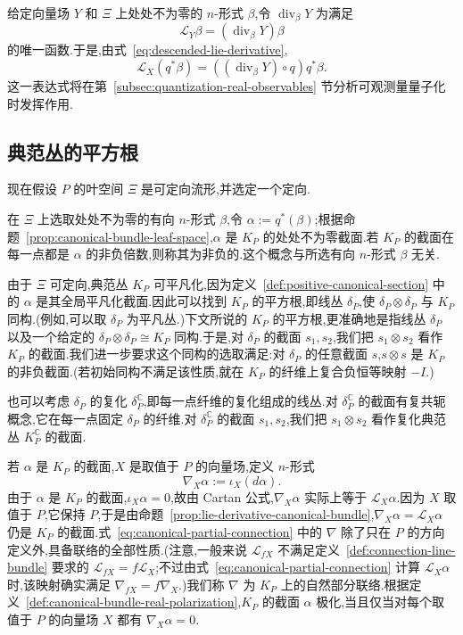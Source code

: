 {给定向量场 $Y$ 和 $\Xi$ 上处处不为零的 $n$-形式 $\beta$,令 $\operatorname{div}_\beta Y$ 为满足
\[
 \mathcal L_Y\beta=(\operatorname{div}_\beta Y)\beta
\]
的唯一函数.于是,由式~\eqref{eq:descended-lie-derivative},
\[
 \mathcal L_X(q^*\beta)
 =((\operatorname{div}_\beta Y)\circ q)q^*\beta.
 \label{eq:canonical-bundle-divergence}
\]
这一表达式将在第~\ref{subsec:quantization-real-observables} 节分析可观测量量子化时发挥作用.

\subsection{典范丛的平方根}
\label{subsec:square-root-canonical-bundle}

现在假设 $P$ 的叶空间 $\Xi$ 是可定向流形,并选定一个定向.

\begin{definition}[典范丛的正截面]
\label{def:positive-canonical-section}
在 $\Xi$ 上选取处处不为零的有向 $n$-形式 $\beta$,令 $\alpha:=q^*(\beta)$;根据命题~\ref{prop:canonical-bundle-leaf-space},$\alpha$ 是 $K_P$ 的处处不为零截面.若 $K_P$ 的截面在每一点都是 $\alpha$ 的非负倍数,则称其为非负的.这个概念与所选有向 $n$-形式 $\beta$ 无关.
\end{definition}

由于 $\Xi$ 可定向,典范丛 $K_P$ 可平凡化,因为定义~\ref{def:positive-canonical-section} 中的 $\alpha$ 是其全局平凡化截面.因此可以找到 $K_P$ 的平方根,即线丛 $\delta_P$,使 $\delta_P\otimes\delta_P$ 与 $K_P$ 同构.(例如,可以取 $\delta_P$ 为平凡丛.)下文所说的 $K_P$ 的平方根,更准确地是指线丛 $\delta_P$ 以及一个给定的 $\delta_P\otimes\delta_P\cong K_P$ 同构.于是,对 $\delta_P$ 的截面 $s_1,s_2$,我们把 $s_1\otimes s_2$ 看作 $K_P$ 的截面.我们进一步要求这个同构的选取满足:对 $\delta_P$ 的任意截面 $s$,$s\otimes s$ 是 $K_P$ 的非负截面.(若初始同构不满足该性质,就在 $K_P$ 的纤维上复合负恒等映射 $-I$.)

也可以考虑 $\delta_P$ 的复化 $\delta_P^{\mathbb C}$,即每一点纤维的复化组成的线丛.对 $\delta_P^{\mathbb C}$ 的截面有复共轭概念,它在每一点固定 $\delta_P$ 的纤维.对 $\delta_P^{\mathbb C}$ 的截面 $s_1,s_2$,我们把 $s_1\otimes s_2$ 看作复化典范丛 $K_P^{\mathbb C}$ 的截面.

若 $\alpha$ 是 $K_P$ 的截面,$X$ 是取值于 $P$ 的向量场,定义 $n$-形式
\[
 \nabla_X\alpha:=\iota_X(d\alpha).
 \label{eq:canonical-partial-connection}
\]
由于 $\alpha$ 是 $K_P$ 的截面,$\iota_X\alpha=0$,故由 Cartan 公式,$\nabla_X\alpha$ 实际上等于 $\mathcal L_X\alpha$.因为 $X$ 取值于 $P$,它保持 $P$,于是由命题~\ref{prop:lie-derivative-canonical-bundle},$\nabla_X\alpha=\mathcal L_X\alpha$ 仍是 $K_P$ 的截面.式~\eqref{eq:canonical-partial-connection} 中的 $\nabla$ 除了只在 $P$ 的方向定义外,具备联络的全部性质.(注意,一般来说 $\mathcal L_{fX}$ 不满足定义~\ref{def:connection-line-bundle} 要求的 $\mathcal L_{fX}=f\mathcal L_X$;不过由式~\eqref{eq:canonical-partial-connection} 计算 $\mathcal L_X\alpha$ 时,该映射确实满足 $\nabla_{fX}=f\nabla_X$.)我们称 $\nabla$ 为 $K_P$ 上的自然部分联络.根据定义~\ref{def:canonical-bundle-real-polarization},$K_P$ 的截面 $\alpha$ 极化,当且仅当对每个取值于 $P$ 的向量场 $X$ 都有 $\nabla_X\alpha=0$.

}
